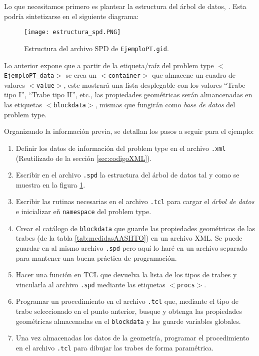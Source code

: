 \documentclass[10pt, a4paper, twocolumn]{article} %
\begin{document}
Lo que necesitamos primero es plantear la estructura del árbol de datos, . Esta podría sintetizarse en el siguiente diagrama:

\begin{figure}[hbt!]\centering
	\texttt{[image: estructura\_spd.PNG]}
	\label{fig:estructura_spd}
	\caption{Estructura del archivo SPD de \texttt{EjemploPT.gid}.}
\end{figure}

Lo anterior expone que a partir de la etiqueta/raíz del problem type \texttt{$<$EjemploPT\_data$>$} se crea un \texttt{$<$container$>$} que almacene un cuadro de valores \texttt{$<$value$>$}, este mostrará una lista desplegable con los valores ``Trabe tipo I'', ``Trabe tipo II'', etc., las propiedades geométricas serán almancenadas en las etiquetas \texttt{$<$blockdata$>$}, mismas que fungirán como \textit{base de datos} del problem type.

Organizando la información previa, se detallan los pasos a seguir para el ejemplo:

\begin{enumerate}
	\item Definir los datos de información del problem type en el archivo \texttt{.xml} (Reutilizado de la sección \ref{sec:codigoXML}).
	\item Escribir en el archivo \texttt{.spd} la estructura del árbol de datos tal y como se muestra en la figura \ref{fig:estructura_spd}.
	\item Escribir las rutinas necesarias en el archivo \texttt{.tcl} para cargar el \textit{árbol de datos} e inicializar eñ \texttt{namespace} del problem type.
	\item Crear el catálogo de \texttt{blockdata} que guarde las propiedades geométricas de las trabes (de la tabla \ref{tab:medidasAASHTO}) en un archivo XML. Se puede guardar en al mismo archivo \texttt{.spd} pero aquí lo haré en un archivo separado para mantener una buena práctica de programación.
	\item Hacer una función en TCL que devuelva la lista de los tipos de trabes y vincularla al archivo \texttt{.spd} mediante las etiquetas \texttt{$<$procs$>$}.
	\item Programar un procedimiento en el archivo \texttt{.tcl} que, mediante el tipo de trabe seleccionado en el punto anterior, busque y obtenga las propiedades geométricas almacenadas en el \texttt{blockdata} y las guarde variables globales.
	\item Una vez almacenadas los datos de la geometría, programar el procedimiento en el archivo \texttt{.tcl} para dibujar las trabes de forma paramétrica.
\end{enumerate}
\end{document}
